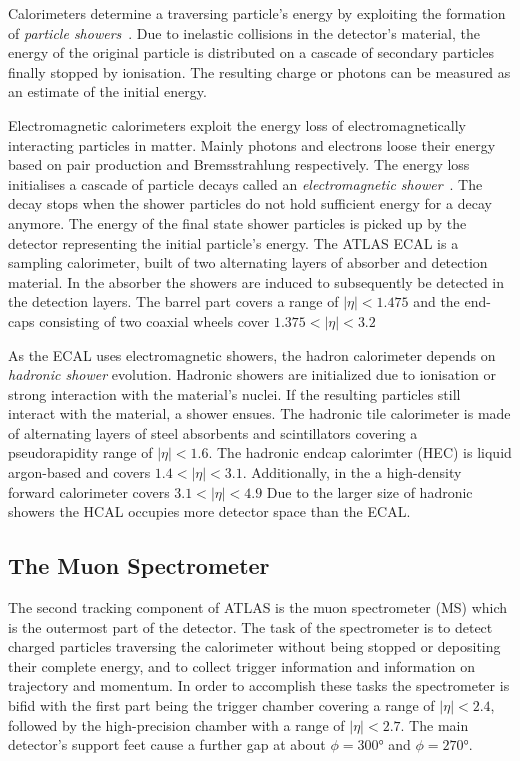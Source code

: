 Calorimeters determine a traversing particle's energy by exploiting the formation of \emph{particle showers}~\cite{wermes}. Due to inelastic collisions in the detector's material, the energy of the original particle is distributed on a cascade of secondary particles finally stopped by ionisation. The resulting charge or photons can be measured as an estimate of the initial energy.

Electromagnetic calorimeters exploit the energy loss of electromagnetically interacting particles in matter. Mainly photons and electrons loose their energy based on pair production and Bremsstrahlung respectively. The energy loss initialises a cascade of particle decays called an \emph{electromagnetic shower}~\cite{wermes}. The decay stops when the shower particles do not hold sufficient energy for a decay anymore. The energy of the final state shower particles is picked up by the detector representing the initial particle's energy.
The ATLAS ECAL is a sampling calorimeter, built of two alternating layers of absorber and detection material. In the absorber the showers are induced to subsequently be detected in the detection layers.
The barrel part covers a range of $|\eta| < 1.475$ and the end-caps consisting of two coaxial wheels cover $1.375 < |\eta| < 3.2$


As the ECAL uses electromagnetic showers, the hadron calorimeter depends on \emph{hadronic shower} evolution. Hadronic showers are initialized due to ionisation or strong interaction with the material's nuclei. If the resulting particles still interact with the material, a shower ensues.
The hadronic tile calorimeter is made of alternating layers of steel absorbents and scintillators covering a pseudorapidity range of $|\eta| < 1.6$.
The hadronic endcap calorimter (HEC) is liquid argon-based and covers $1.4 < |\eta| < 3.1$. Additionally, in the a high-density forward calorimeter covers $3.1 < |\eta| < 4.9$
Due to the larger size of hadronic showers the HCAL occupies more detector space than the ECAL.


\subsection{The Muon Spectrometer}

The second tracking component of ATLAS is the muon spectrometer (MS) which is the outermost part of the detector. The task of the spectrometer is to detect charged particles traversing the calorimeter without being stopped or depositing their complete energy, and to collect trigger information and information on trajectory and momentum. In order to accomplish these tasks the spectrometer is bifid with the first part being the trigger chamber covering a range of $|\eta|<2.4$, followed by the high-precision chamber with a range of $|\eta|<2.7$. The main detector's support feet cause a further gap at about $\phi = \ang{300}$ and $\phi = \ang{270}$.

